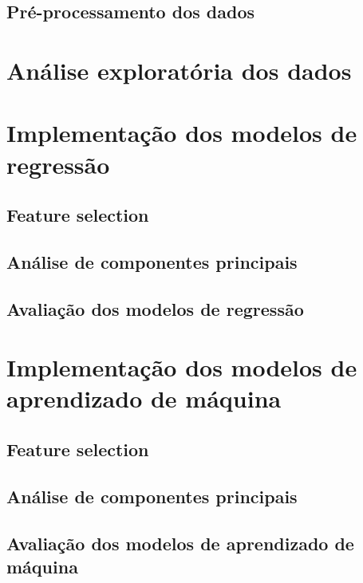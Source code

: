 \subsection{Pré-processamento dos dados}


\section{Análise exploratória dos dados}


\section{Implementação dos modelos de regressão}


\subsection{Feature selection}


\subsection{Análise de componentes principais}


\subsection{Avaliação dos modelos de regressão}


\section{Implementação dos modelos de aprendizado de máquina}


\subsection{Feature selection}


\subsection{Análise de componentes principais}


\subsection{Avaliação dos modelos de aprendizado de máquina}
